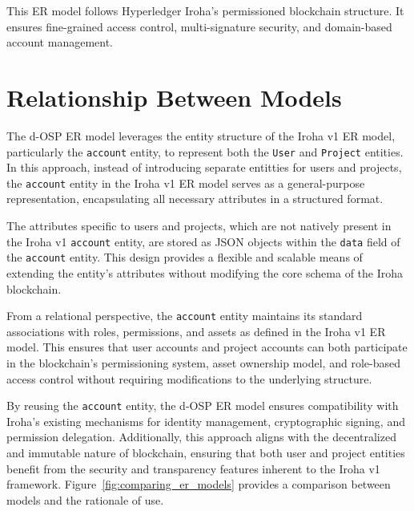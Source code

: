 \documentclass[final]{rc-book-2.14}
\begin{document}
This ER model follows Hyperledger Iroha’s permissioned blockchain structure. It ensures fine-grained access control, multi-signature security, and domain-based account management.


\section{Relationship Between Models}
\label{chp:proposed_model:sec:iroha_data_model}

The d-OSP ER model leverages the entity structure of the Iroha v1 ER model, particularly the \texttt{account} entity, to represent both the \texttt{User} and \texttt{Project} entities. In this approach, instead of introducing separate entitties for users and projects, the \texttt{account} entity in the Iroha v1 ER model serves as a general-purpose representation, encapsulating all necessary attributes in a structured format.

The attributes specific to users and projects, which are not natively present in the Iroha v1 \texttt{account} entity, are stored as JSON objects within the \texttt{data} field of the \texttt{account} entity. This design provides a flexible and scalable means of extending the entity's attributes without modifying the core schema of the Iroha blockchain.

From a relational perspective, the \texttt{account} entity maintains its standard associations with roles, permissions, and assets as defined in the Iroha v1 ER model. This ensures that user accounts and project accounts can both participate in the blockchain's permissioning system, asset ownership model, and role-based access control without requiring modifications to the underlying structure.

By reusing the \texttt{account} entity, the d-OSP ER model ensures compatibility with Iroha's existing mechanisms for identity management, cryptographic signing, and permission delegation. Additionally, this approach aligns with the decentralized and immutable nature of blockchain, ensuring that both user and project entities benefit from the security and transparency features inherent to the Iroha v1 framework. Figure~\ref{fig:comparing_er_models} provides a comparison between models and the rationale of use.
\end{document}
